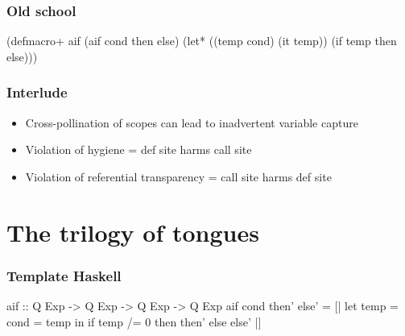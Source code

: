 \documentclass[hyperref={bookmarks=false}]{beamer}
\begin{document}
\begin{frame}[fragile]
\frametitle{Old school}
\begin{semiverbatim}
(defmacro+ aif
  (aif cond then else)
    (let* ((temp cond)
           (it temp))
      (if temp then else)))
\end{semiverbatim}

\end{frame}

\begin{frame}[fragile]
\frametitle{Interlude}
\begin{itemize}
\item Cross-pollination of scopes can lead to inadvertent variable capture
\item Violation of hygiene = def site harms call site
\item Violation of referential transparency = call site harms def site
\end{itemize}
\end{frame}

\section{The trilogy of tongues}

\begin{frame}[fragile]
\frametitle{Template Haskell}
\begin{semiverbatim}

aif :: Q Exp -> Q Exp -> Q Exp -> Q Exp
aif cond then' else' =
  [| let temp = {\textdollar}cond
          = temp
     in if temp /= 0 then {\textdollar}then' else {\textdollar}else' |]


\end{semiverbatim}
\end{frame}
\end{document}
